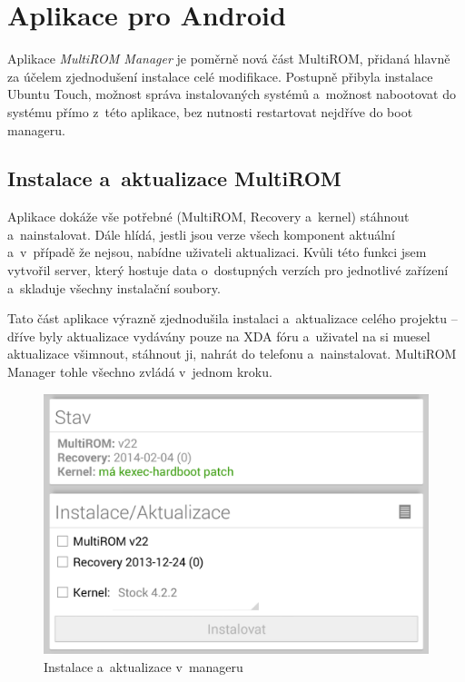 \documentclass[12pt, a4paper, oneside]{article}
\newcommand{\It}{\textit}  %
\begin{document}
\section{Aplikace pro Android}
Aplikace \It{MultiROM Manager} je poměrně nová část MultiROM, přidaná hlavně za účelem zjednodušení instalace celé modifikace. Postupně přibyla instalace Ubuntu Touch, možnost správa instalovaných systémů a~možnost nabootovat do systému přímo z~této aplikace, bez nutnosti restartovat nejdříve do boot manageru.

\subsection{Instalace a~aktualizace MultiROM}
Aplikace dokáže vše potřebné (MultiROM, Recovery a~kernel) stáhnout a~nainstalovat. Dále hlídá, jestli jsou verze všech komponent aktuální a~v~případě že nejsou, nabídne uživateli aktualizaci. Kvůli této funkci jsem vytvořil server, který hostuje data o~dostupných verzích pro jednotlivé zařízení a~skladuje všechny instalační soubory.

Tato část aplikace výrazně zjednodušila instalaci a~aktualizace celého projektu -- dříve byly aktualizace vydávány pouze na XDA fóru a~uživatel na si muesel aktualizace všimnout, stáhnout ji, nahrát do telefonu a~nainstalovat. MultiROM Manager tohle všechno zvládá v~jednom kroku.

\begin{figure}[H]
\begin{center}
 \includegraphics[width=\textwidth]{img/mgr_install.png}
\caption{Instalace a~aktualizace v~manageru}
\end{center}
\end{figure}
\end{document}
